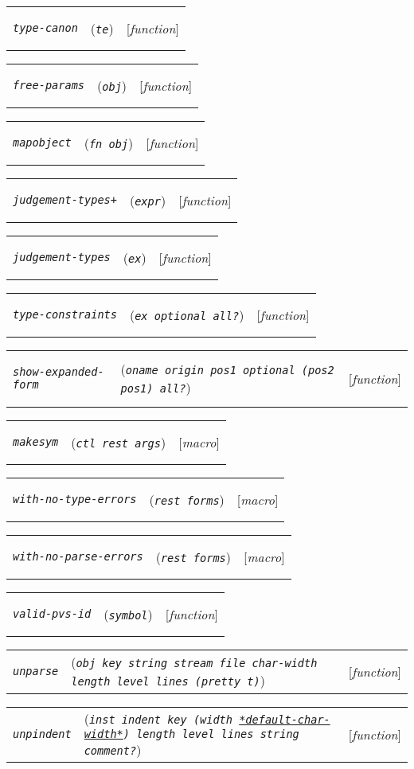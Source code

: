 \documentclass[12pt]{book}
\makeatletter
\def\ampoptional{{\smaller\sc {\smaller\smaller \&}optional\ }}
\def\amprest{{\smaller\sc {\smaller\smaller \&}rest\ }}
\def\ampkey{{\smaller\sc {\smaller\smaller \&}key\ }}
\newenvironment{function}[3]%
{\par\noindent\begin{boxedminipage}{\textwidth}%
 \par\noindent\begin{tabularx}{\linewidth}{l>{\raggedright}Xr}%
 \functionhtgt{#1}&(\texttt{\textit{#2}})&[\emph{#3}]%
 \end{tabularx}\par\flushright\begin{minipage}{.97\textwidth}}
{\end{minipage}\end{boxedminipage}}
\newcommand{\functionnm}[1]{\texttt{\textit{#1}}}
\newcommand{\functionhtgt}[1]{\hypertarget{#1}{\functionnm{#1}}\index{#1@\functionnm{#1}|underline}}
\newenvironment{lispfunction}[2]%
{\begin{function}{#1}{#2}{function}}{\end{function}}
\newenvironment{macro}[2]%
{\begin{function}{#1}{#2}{macro}}{\end{function}}
\newcommand{\globalnm}[1]{\texttt{\textup{#1}}}
\newcommand{\globalhln}[1]{\hyperlink{#1}{\globalnm{#1}}}
\makeatother
\begin{document}
\begin{lispfunction}{type-canon}{te}
\end{lispfunction}

\begin{lispfunction}{free-params}{obj}
\end{lispfunction}

\begin{lispfunction}{mapobject}{fn obj}
\end{lispfunction}

\begin{lispfunction}{judgement-types+}{expr}
\end{lispfunction}

\begin{lispfunction}{judgement-types}{ex}
\end{lispfunction}

\begin{lispfunction}{type-constraints}{ex \ampoptional all?}
\end{lispfunction}

\begin{lispfunction}{show-expanded-form}
  {oname origin pos1 \ampoptional \textup{(}pos2 pos1\textup{)} all?}
\end{lispfunction}

\begin{macro}{makesym}{ctl \amprest args}
\end{macro}

\begin{macro}{with-no-type-errors}{\amprest forms}
\end{macro}

\begin{macro}{with-no-parse-errors}{\amprest forms}
\end{macro}

\begin{lispfunction}{valid-pvs-id}{symbol}
\end{lispfunction}

\begin{lispfunction}{unparse}
  {obj \ampkey string stream file char-width length level lines \textup{(}pretty \textup{t}\textup{)}}
\end{lispfunction}

\begin{lispfunction}{unpindent}
  {inst indent \ampkey \textup{(}width \globalhln{*default-char-width*}\textup{)} length level lines string comment?}
\end{lispfunction}
\end{document}
